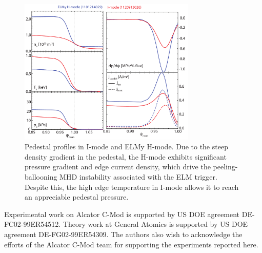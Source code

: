 \documentclass[12pt,floatfix,showpacs]{revtex4-1}
\begin{document}
\begin{figure}[ht]
 \includegraphics[width=0.75\textwidth]{pdfgraphics/prof_elmy_imode.pdf}
 \caption{Pedestal profiles in I-mode and ELMy H-mode. Due to the steep density gradient in the pedestal, the H-mode exhibits significant pressure gradient and edge current density, which drive the peeling-ballooning MHD instability associated with the ELM trigger. Despite this, the high edge temperature in I-mode allows it to reach an appreciable pedestal pressure.}
 \label{fig:prof_elmy_imode}
\end{figure}


\begin{acknowledgments}
 Experimental work on Alcator C-Mod is supported by US DOE agreement DE-FC02-99ER54512. Theory work at General Atomics is supported by US DOE agreement DE-FG02-99ER54309.  The authors also wish to acknowledge the efforts of the Alcator C-Mod team for supporting the experiments reported here.
\end{acknowledgments}



\end{document}
